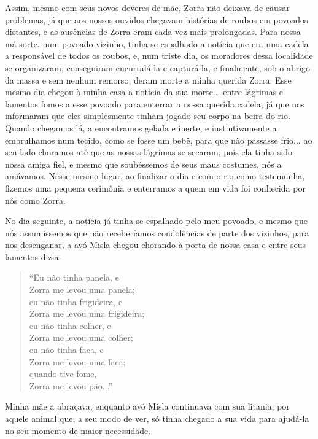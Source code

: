 Assim, mesmo com seus novos deveres de mãe, Zorra não deixava de causar problemas, já que aos nossos ouvidos chegavam histórias de roubos em povoados distantes, e as ausências de Zorra eram cada vez mais prolongadas.
Para nossa má sorte, num povoado vizinho, tinha-se espalhado a notícia que era uma cadela a responsável de todos os roubos, e, num triste dia, os moradores dessa localidade se organizaram, conseguiram encurralá-la e capturá-la, e finalmente, sob o abrigo da massa e sem nenhum remorso, deram morte a minha querida Zorra.
Esse mesmo dia chegou à minha casa a notícia da sua morte... entre lágrimas e lamentos fomos a esse povoado para enterrar a nossa querida cadela, já que nos informaram que eles simplesmente tinham jogado seu corpo na beira do rio. Quando chegamos lá, a encontramos gelada e inerte, e instintivamente a embrulhamos num tecido, como se fosse um bebê, para que não passasse frio... ao seu lado choramos até que as nossas lágrimas se secaram, pois ela tinha sido nossa amiga fiel, e mesmo que soubéssemos de  seus maus costumes, nós a amávamos.
Nesse mesmo lugar, ao finalizar o dia e com o rio como testemunha, fizemos uma pequena cerimônia e enterramos a quem em vida foi conhecida por nós como Zorra. 

No dia seguinte, a notícia já tinha se espalhado pelo meu povoado, e mesmo que nós assumíssemos que não receberíamos condolências de parte dos vizinhos, para nos desenganar, a avó Misla chegou chorando à porta de nossa casa e entre seus lamentos dizia:
\begin{quotation}
\noindent ``Eu não tinha panela, e \\Zorra me levou uma panela;\\ 
eu não tinha frigideira, e \\Zorra me levou uma frigideira;\\ 
eu não tinha colher, e \\Zorra me levou uma colher;\\
eu não tinha faca, e \\Zorra me levou uma faca;\\
quando tive fome, \\Zorra me levou pão...''
\end{quotation}
Minha mãe a abraçava, enquanto avó Misla continuava com sua litania, por aquele animal que, a seu modo de ver, só tinha chegado a sua vida para ajudá-la no seu momento de maior necessidade.
 


